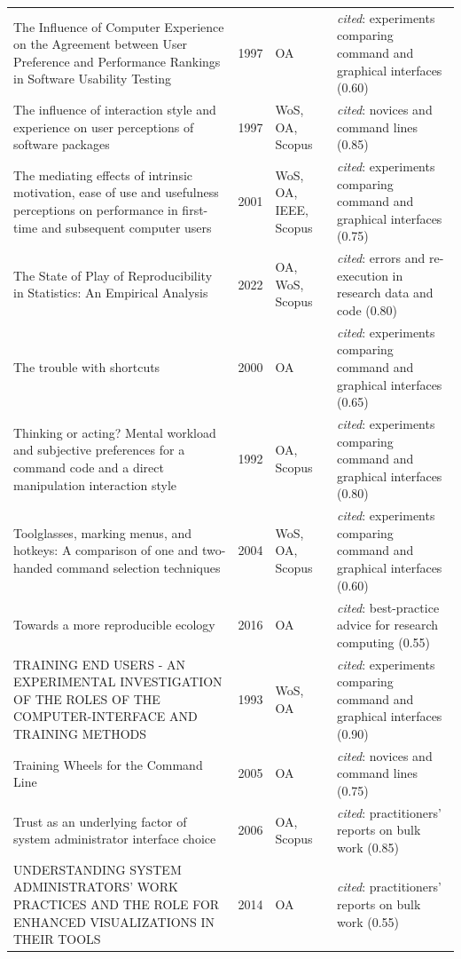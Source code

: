 \begin{longtable}{@{}%
  >{\raggedright\arraybackslash}p{}c%
  >{\raggedright\arraybackslash}p{}%
  >{\raggedright\arraybackslash}p{}@{}}
The Influence of Computer Experience on the Agreement between User Preference and Performance Rankings in Software Usability Testing & 1997 & OA & \emph{cited}: experiments comparing command and graphical interfaces (0.60) \\
The influence of interaction style and experience on user perceptions of software packages & 1997 & WoS, OA, Scopus & \emph{cited}: novices and command lines (0.85) \\
The mediating effects of intrinsic motivation, ease of use and usefulness perceptions on performance in first-time and subsequent computer users & 2001 & WoS, OA, IEEE, Scopus & \emph{cited}: experiments comparing command and graphical interfaces (0.75) \\
The State of Play of Reproducibility in Statistics: An Empirical Analysis & 2022 & OA, WoS, Scopus & \emph{cited}: errors and re-execution in research data and code (0.80) \\
The trouble with shortcuts & 2000 & OA & \emph{cited}: experiments comparing command and graphical interfaces (0.65) \\
Thinking or acting? Mental workload and subjective preferences for a command code and a direct manipulation interaction style & 1992 & OA, Scopus & \emph{cited}: experiments comparing command and graphical interfaces (0.80) \\
Toolglasses, marking menus, and hotkeys: A comparison of one and two-handed command selection techniques & 2004 & WoS, OA, Scopus & \emph{cited}: experiments comparing command and graphical interfaces (0.60) \\
Towards a more reproducible ecology & 2016 & OA & \emph{cited}: best-practice advice for research computing (0.55) \\
TRAINING END USERS - AN EXPERIMENTAL INVESTIGATION OF THE ROLES OF THE COMPUTER-INTERFACE AND TRAINING METHODS & 1993 & WoS, OA & \emph{cited}: experiments comparing command and graphical interfaces (0.90) \\
Training Wheels for the Command Line & 2005 & OA & \emph{cited}: novices and command lines (0.75) \\
Trust as an underlying factor of system administrator interface choice & 2006 & OA, Scopus & \emph{cited}: practitioners' reports on bulk work (0.85) \\
UNDERSTANDING SYSTEM ADMINISTRATORS' WORK PRACTICES AND THE ROLE FOR ENHANCED VISUALIZATIONS IN THEIR TOOLS & 2014 & OA & \emph{cited}: practitioners' reports on bulk work (0.55) \\

\end{longtable}
